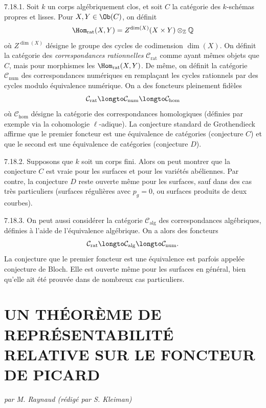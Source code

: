7.18.1. Soit $k$ un corps alg\'ebriquement clos, et soit $C$ la cat\'egorie des $k$-sch\'emas propres et lisses. Pour $X, Y \in \Ob(C)$, on d\'efinit
\[
\Hom_{\mathrm{rat}}(X, Y) = Z^{\dim(X)}(X \times Y) \otimes_{\mathbb{Z}} \mathbb{Q}
\]
o\`u $Z^{\dim(X)}$ d\'esigne le groupe des cycles de codimension $\dim(X)$. On d\'efinit la cat\'egorie des \emph{correspondances rationnelles} $\mathcal{C}_{\mathrm{rat}}$ comme ayant m\^emes objets que $C$, mais pour morphismes les $\Hom_{\mathrm{rat}}(X, Y)$. De m\^eme, on d\'efinit la cat\'egorie $\mathcal{C}_{\mathrm{num}}$ des correspondances num\'eriques en rempla\c cant les cycles rationnels par des cycles modulo \'equivalence num\'erique. On a des foncteurs pleinement fid\`eles
\[
\mathcal{C}_{\mathrm{rat}} \longto \mathcal{C}_{\mathrm{num}} \longto \mathcal{C}_{\mathrm{hom}}
\]
o\`u $\mathcal{C}_{\hom}$ d\'esigne la cat\'egorie des correspondances homologiques (d\'efinies par exemple via la cohomologie $\ell$-adique). La conjecture standard de Grothendieck affirme que le premier foncteur est une \'equivalence de cat\'egories (conjecture $C$) et que le second est une \'equivalence de cat\'egories (conjecture $D$).

7.18.2. Supposons que $k$ soit un corps fini. Alors on peut montrer que la conjecture $C$ est vraie pour les surfaces et pour les vari\'et\'es ab\'eliennes. Par contre, la conjecture $D$ reste ouverte m\^eme pour les surfaces, sauf dans des cas tr\`es particuliers (surfaces r\'eguli\`eres avec $p_{g} = 0$, ou surfaces produits de deux courbes).

7.18.3. On peut aussi consid\'erer la cat\'egorie $\mathcal{C}_{\mathrm{alg}}$ des correspondances alg\'ebriques, d\'efinies \`a l'aide de l'\'equivalence alg\'ebrique. On a alors des foncteurs
\[
\mathcal{C}_{\mathrm{rat}} \longto \mathcal{C}_{\mathrm{alg}} \longto \mathcal{C}_{\mathrm{num}}.
\]
La conjecture que le premier foncteur est une \'equivalence est parfois appel\'ee conjecture de Bloch. Elle est ouverte m\^eme pour les surfaces en g\'en\'eral, bien qu'elle ait \'et\'e prouv\'ee dans de nombreux cas particuliers.

\section*{UN TH\'EOR\`EME DE REPR\'ESENTABILIT\'E RELATIVE SUR LE FONCTEUR DE PICARD}
\begin{flushright}
\textit{par M. Raynaud (r\'edig\'e par S. Kleiman)}
\end{flushright}

